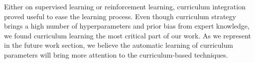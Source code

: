 Either on supervised learning or reinforcement learning, curriculum integration proved useful to ease the learning process. Even though curriculum strategy brings a high number of hyperparameters and prior bias from expert knowledge, we found curriculum learning the most critical part of our work. As we represent in the future work section, we believe the automatic learning of curriculum parameters will bring more attention to the curriculum-based techniques.
